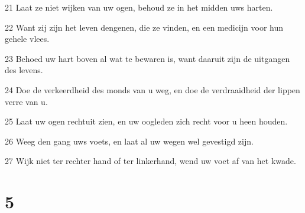 \par 21 Laat ze niet wijken van uw ogen, behoud ze in het midden uws harten.
\par 22 Want zij zijn het leven dengenen, die ze vinden, en een medicijn voor hun gehele vlees.
\par 23 Behoed uw hart boven al wat te bewaren is, want daaruit zijn de uitgangen des levens.
\par 24 Doe de verkeerdheid des monds van u weg, en doe de verdraaidheid der lippen verre van u.
\par 25 Laat uw ogen rechtuit zien, en uw oogleden zich recht voor u heen houden.
\par 26 Weeg den gang uws voets, en laat al uw wegen wel gevestigd zijn.
\par 27 Wijk niet ter rechter hand of ter linkerhand, wend uw voet af van het kwade.

\chapter{5}

